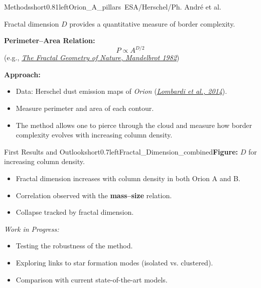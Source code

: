\documentclass[hyperref={pdfpagelabels=false}, aspectratio=169, t]{beamer}  %
\begin{document}
\begin{graphicsFrame}{Methods}{short}{0.81}{left}{Orion_A_pillars}{\textcopyright~ESA/Herschel/Ph. André et al.}

	Fractal dimension $D$ provides a quantitative measure of border complexity.

	\vspace{0.8em}

	\textbf{Perimeter–Area Relation:}
	\[
		P \propto A^{D/2}
	\] 
	(e.g., \href{https://ui.adsabs.harvard.edu/abs/1982mfmb.book.....M/abstract}{\textit{The Fractal Geometry of Nature, Mandelbrot 1982}})
	
	\vspace{0.8em}
	
	\textbf{Approach:}
	\begin{itemize}
		\item Data: Herschel dust emission maps of \textit{Orion} (\href{https://ui.adsabs.harvard.edu/abs/2014A&A...566A..45L/abstract}{\textit{Lombardi et al., 2014}}).
		\item Measure perimeter and area of each contour.
		\item The method allows one to pierce through the cloud and measure how border complexity evolves with increasing column density.
	\end{itemize}
\end{graphicsFrame}



\begin{graphicsFrame}{First Results and Outlook}{short}{0.7}{left}{Fractal_Dimension_combined}{\textbf{Figure:} $D$ for increasing column density.}

	\begin{itemize}
		\item Fractal dimension increases with column density in both Orion A and B.
		\item Correlation observed with the \textbf{mass–size} relation.
		\item Collapse tracked by fractal dimension.
	\end{itemize}
	\vspace{0.8em}
	\textit{Work in Progress:}
	\begin{itemize}
		\item Testing the robustness of the method.
		\item Exploring links to star formation modes (isolated vs. clustered).
		\item Comparison with current state-of-the-art models.
	\end{itemize}

\end{graphicsFrame}
\end{document}
